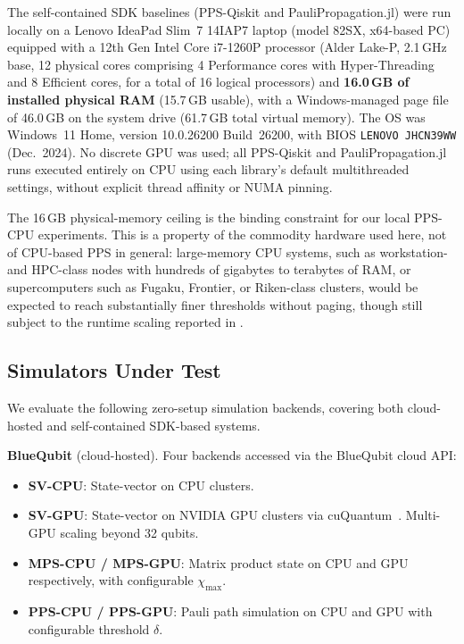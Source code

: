 \documentclass[conference,10pt]{IEEEtran}
\begin{document}
The self-contained SDK baselines (PPS-Qiskit and PauliPropagation.jl) were run locally on a Lenovo IdeaPad Slim~7 14IAP7 laptop (model 82SX, x64-based PC) equipped with a 12th Gen Intel Core i7-1260P processor (Alder Lake-P, 2.1\,GHz base, 12 physical cores comprising 4 Performance cores with Hyper-Threading and 8 Efficient cores, for a total of 16 logical processors) and \textbf{16.0\,GB of installed physical RAM} (15.7\,GB usable), with a Windows-managed page file of 46.0\,GB on the system drive (61.7\,GB total virtual memory). The OS was Windows~11 Home, version 10.0.26200 Build~26200, with BIOS \texttt{LENOVO JHCN39WW} (Dec.\ 2024). No discrete GPU was used; all PPS-Qiskit and PauliPropagation.jl runs executed entirely on CPU using each library's default multithreaded settings, without explicit thread affinity or NUMA pinning.

The 16\,GB physical-memory ceiling is the binding constraint for our local PPS-CPU experiments. This is a property of the commodity hardware used here, not of CPU-based PPS in general: large-memory CPU systems, such as workstation- and HPC-class nodes with hundreds of gigabytes to terabytes of RAM, or supercomputers such as Fugaku, Frontier, or Riken-class clusters, would be expected to reach substantially finer thresholds without paging, though still subject to the runtime scaling reported in .
    
    \subsection{Simulators Under Test}
     
    We evaluate the following zero-setup simulation backends, covering both cloud-hosted and self-contained SDK-based systems.
     
    \textbf{BlueQubit} (cloud-hosted). Four backends accessed via the BlueQubit cloud API:
    \begin{itemize}
        \item \textbf{SV-CPU}: State-vector on CPU clusters.
        \item \textbf{SV-GPU}: State-vector on NVIDIA GPU clusters via cuQuantum~\cite{bayraktar2023cuquantum}. Multi-GPU scaling beyond 32 qubits.
        \item \textbf{MPS-CPU / MPS-GPU}: Matrix product state on CPU and GPU respectively, with configurable $\chi_{\max}$.
        \item \textbf{PPS-CPU / PPS-GPU}: Pauli path simulation on CPU and GPU with configurable threshold $\delta$.
    \end{itemize}
    
\end{document}
